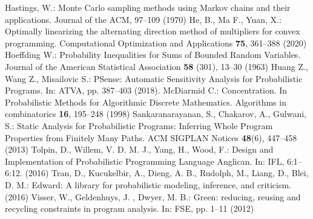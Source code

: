 \documentclass[runningheads]{llncs}
\begin{document}
\begin{thebibliography}{8}
Hastings, W.: Monte Carlo sampling methods using Markov chains and their applications. Journal of the ACM, 97--109 (1970)
He, B., Ma F., Yuan, X.: Optimally linearizing the alternating direction method of multipliers for convex programming. Computational Optimization and Applications \textbf{75}, 361--388 (2020)
Hoeffding W.: Probability Inequalities for Sums of Bounded Random Variables. Journal of the American Statistical Association \textbf{58} (301), 13--30 (1963)
Huang Z., Wang Z., Misailovic S.: PSense: Automatic Sensitivity Analysis for Probabilistic Programs. In: ATVA, pp. 387--403 (2018). 
McDiarmid C.: Concentration. In Probabilistic Methods for Algorithmic Discrete Mathematics. Algorithms in combinatorics \textbf{16}, 195--248 (1998)
Sankaranarayanan, S., Chakarov, A., Gulwani, S.: Static Analysis for Probabilistic Programs: Inferring Whole Program Properties from Finitely Many Paths. ACM SIGPLAN Notices \textbf{48}(6), 447--458 (2013)
Tolpin, D., Willem, V. D. M. J., Yang, H., Wood, F.: Design and Implementation of Probabilistic Programming Language Anglican. In: IFL, 6:1–6:12. (2016)
Tran, D., Kucukelbir, A., Dieng, A. B., Rudolph, M., Liang, D., Blei, D. M.: Edward: A library for probabilistic modeling, inference, and criticism. (2016) 
Visser, W., Geldenhuys, J. , Dwyer, M. B.: Green: reducing, reusing and recycling constraints in program analysis. In: FSE, pp. 1--11 (2012)
\end{thebibliography}
\end{document}
